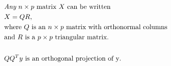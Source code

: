 \documentclass[convert={density=300,outext=.png}]{standalone}
\begin{document}
\begin{minipage}[t]{0.3\textwidth}
\begin{align*}
&\mbox{{\it Any} $n\times p$ matrix $X$ can be written}\\
&X = QR,\\
&\mbox{where $Q$ is an $n\times p$ matrix with orthonormal columns}\\
&\mbox{and $R$ is a $p \times p$ triangular matrix.}\\
\\
&Q Q^T y \mbox{ is an orthogonal projection of y}.
\end{align*}
\end{minipage}
\end{document}
